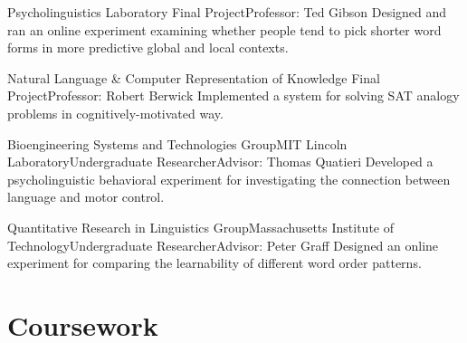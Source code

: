 \documentclass[11pt,letter]{moderncv}
\begin{document}
\raggedright
{}
{Psycholinguistics Laboratory Final Project}{}{}{Professor: Ted Gibson}{
%
Designed and ran an online experiment examining whether people tend to pick shorter word forms in more predictive global and local contexts.
%
}
\vspace*{0.25em}

\raggedright
{}
{Natural Language \& Computer Representation of Knowledge Final Project}{}{}{Professor: Robert Berwick}{
%
Implemented a system for solving SAT analogy problems in cognitively-motivated way.
%
}
\vspace*{0.25em}

\raggedright
{}
{Bioengineering Systems and Technologies Group}{MIT Lincoln Laboratory}{Undergraduate Researcher}{Advisor: Thomas Quatieri}{
%
Developed a psycholinguistic behavioral experiment for investigating the connection between language and motor control.
%
}
\vspace*{0.25em}

%
%

\raggedright
{}
{Quantitative Research in Linguistics Group}{Massachusetts Institute of Technology}{Undergraduate Researcher}{Advisor: Peter Graff}{
%
Designed an online experiment for comparing the learnability of different word order patterns.
%
}


%
%

\section{Coursework}

\end{document}
